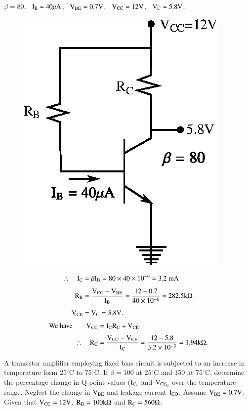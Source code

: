 \begin{solution}
$\beta=80$, \ $\textrm{I}_{\textrm{B}}=40\mu\textrm{A}$, \ $\textrm{V}_{\text{BE}}=0.7\textrm{V}$, \ $\textrm{V}_{\text{CC}}=12\textrm{V}$, \ $\textrm{V}_{\textrm{C}}=5.8\textrm{V}$.
\begin{figure}[H]
\centering
\includegraphics[scale=.95]{chap3/fig3.7.eps}
\end{figure}
\begin{align*}
\therefore\quad \textrm{I}_{\textrm{C}} &= \beta \textrm{I}_{\textrm{B}}=80\times 40\times 10^{-6}=3.2\text{~mA}\\[4pt]
\textrm{R}_{\textrm{B}} &= \frac{\textrm{V}_{\text{CC}}-\textrm{V}_{\text{BE}}}{\textrm{I}_{\textrm{B}}}=\dfrac{12-0.7}{40\times 10^{-6}}=282.5 \textrm{k}\Omega\\[4pt]
\textrm{V}_{\text{CE}} &= \textrm{V}_{\textrm{C}}=5.8\textrm{V}.
\end{align*}
\begin{align*}
\text{We have}\qquad \textrm{V}_{\text{CC}} &= \textrm{I}_{\textrm{C}}\textrm{R}_{\textrm{C}}+\textrm{V}_{\text{CE}}\\[3pt]
\therefore\quad \textrm{R}_{\textrm{C}} &= \frac{\textrm{V}_{\text{CC}}-\textrm{V}_{\text{CE}}}{\textrm{I}_{\textrm{C}}}=\frac{12-5.8}{3.2\times 10^{-3}}=1.94\textrm{k}\Omega.
\end{align*}
\end{solution}

\begin{problem}\label{prob3.2}
A transistor amplifier employing fixed bias circuit is subjected to an increase in temperature form $25^{\circ}$C to $75^{\circ}$C. If $\beta=100$ at $25^{\circ}$C and 150 at $75^{\circ}$C, determine the percentage change in Q-point values ($\textrm{I}_{\textrm{C}_{\textrm{a}}}$ and $\textrm{V}_{\text{CE}_{\textrm{Q}}}$ over the temperature range. Neglect the change in $\textrm{V}_{\text{BE}}$ and leakage current $\textrm{I}_{\text{CO}}$. Assume $\textrm{V}_{\text{BE}}=0.7\textrm{V}$. Given that $\textrm{V}_{\text{CC}}=12\textrm{V}$, $\textrm{R}_{\textrm{B}}=100\textrm{k}\Omega$ and $\textrm{R}_{\textrm{C}}=560\Omega$.
\end{problem}

